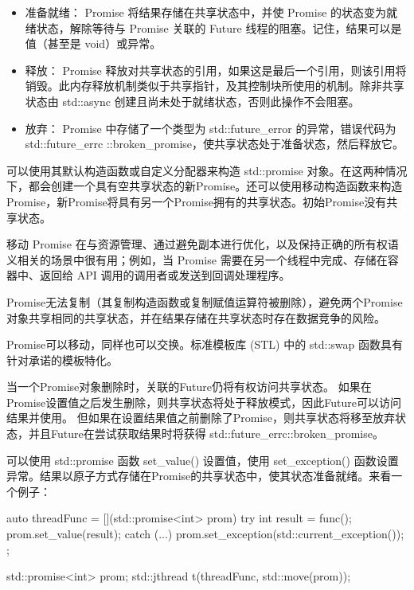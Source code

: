 \begin{itemize}
\item
准备就绪： Promise 将结果存储在共享状态中，并使 Promise 的状态变为就绪状态，解除等待与 Promise 关联的 Future 线程的阻塞。记住，结果可以是值（甚至是 void）或异常。

\item
释放： Promise 释放对共享状态的引用，如果这是最后一个引用，则该引用将销毁。此内存释放机制类似于共享指针，及其控制块所使用的机制。除非共享状态由 std::async 创建且尚未处于就绪状态，否则此操作不会阻塞。

\item
放弃： Promise 中存储了一个类型为 std::future\_error 的异常，错误代码为 std::future\_errc ::broken\_promise，使共享状态处于准备状态，然后释放它。
\end{itemize}

可以使用其默认构造函数或自定义分配器来构造 std::promise 对象。在这两种情况下，都会创建一个具有空共享状态的新Promise。还可以使用移动构造函数来构造Promise，新Promise将具有另一个Promise拥有的共享状态。初始Promise没有共享状态。

移动 Promise 在与资源管理、通过避免副本进行优化，以及保持正确的所有权语义相关的场景中很有用；例如，当 Promise 需要在另一个线程中完成、存储在容器中、返回给 API 调用的调用者或发送到回调处理程序。

Promise无法复制（其复制构造函数或复制赋值运算符被删除），避免两个Promise对象共享相同的共享状态，并在结果存储在共享状态时存在数据竞争的风险。

Promise可以移动，同样也可以交换。标准模板库 (STL) 中的 std::swap 函数具有针对承诺的模板特化。

当一个Promise对象删除时，关联的Future仍将有权访问共享状态。 如果在Promise设置值之后发生删除，则共享状态将处于释放模式，因此Future可以访问结果并使用。 但如果在设置结果值之前删除了Promise，则共享状态将移至放弃状态，并且Future在尝试获取结果时将获得 std::future\_errc::broken\_promise。

可以使用 std::promise 函数 set\_value() 设置值，使用 set\_exception() 函数设置异常。结果以原子方式存储在Promise的共享状态中，使其状态准备就绪。来看一个例子：

\begin{cpp}
auto threadFunc = [](std::promise<int> prom) {
    try {
        int result = func();
        prom.set_value(result);
    } catch (...) {
        prom.set_exception(std::current_exception());
    }
};

std::promise<int> prom;
std::jthread t(threadFunc, std::move(prom));
\end{cpp}

